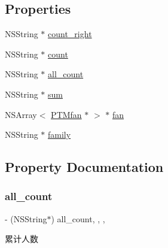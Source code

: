 \subsection*{Properties}
\begin{DoxyCompactItemize}
\item 
N\+S\+String $\ast$ \mbox{\hyperlink{interface_f_n_promotional_team_model_af3e768076a52dd74a65c4d4351b395d8}{count\+\_\+right}}
\item 
N\+S\+String $\ast$ \mbox{\hyperlink{interface_f_n_promotional_team_model_aea2722a1223206301f4af1d69ff78282}{count}}
\item 
N\+S\+String $\ast$ \mbox{\hyperlink{interface_f_n_promotional_team_model_a222553ecb574cb8a4a8cac0132da43e2}{all\+\_\+count}}
\item 
N\+S\+String $\ast$ \mbox{\hyperlink{interface_f_n_promotional_team_model_a2a2850656573bfedfc81194156cc6d12}{sum}}
\item 
N\+S\+Array$<$ \mbox{\hyperlink{interface_p_t_mfan}{P\+T\+Mfan}} $\ast$ $>$ $\ast$ \mbox{\hyperlink{interface_f_n_promotional_team_model_a736ef61b4b10375ce09de1355c3b9d88}{fan}}
\item 
N\+S\+String $\ast$ \mbox{\hyperlink{interface_f_n_promotional_team_model_afefae66462e63c82ed7c3244d2b2ae9b}{family}}
\end{DoxyCompactItemize}


\subsection{Property Documentation}
\mbox{\label{interface_f_n_promotional_team_model_a222553ecb574cb8a4a8cac0132da43e2}} 
\subsubsection{\texorpdfstring{all\+\_\+count}{all\_count}}
{\footnotesize\ttfamily -\/ (N\+S\+String$\ast$) all\+\_\+count\hspace{0.3cm}{\ttfamily [read]}, {\ttfamily [write]}, {\ttfamily [nonatomic]}, {\ttfamily [copy]}}

累计人数 \mbox{\label{interface_f_n_promotional_team_model_aea2722a1223206301f4af1d69ff78282}} 
